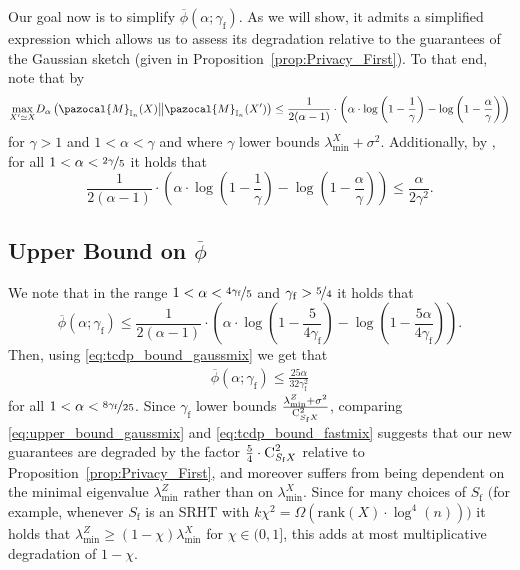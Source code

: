 \documentclass[11pt]{article}
\theoremstyle{definition}
\theoremstyle{plain}
\providecommand{\propositionref}[1]{Proposition~\ref{#1}}
\providecommand{\brI}{\mathbb{I}}
\providecommand{\KLDA}[2]{{D_{\alpha} \left( #1 \middle\| #2 \right)}}
\newcommand{\pM}{\pazocal{M}}
\begin{document}
Our goal now is to simplify $\overline{\phi}(\alpha; \gamma_{\mathrm{f}})$. As we will show, it admits a simplified expression which allows us to assess its degradation relative to the guarantees of the Gaussian sketch (given in \propositionref{prop:Privacy_First}). To that end, note that by \citet[Lemma.~1]{lev2025gaussianmix} 
\begin{align}
    \label{eq:upper_bound_gaussmix}
    \underset{X'\simeq X}{\max} \KLDA{\pM_{\brI_n}(X)}{\pM_{\brI_n}(X')} \leq \frac{1}{2(\alpha - 1)}\cdot \left(\alpha \cdot \log\left(1 - \frac{1}{\gamma}\right) - \log\left(1 - \frac{\alpha}{\gamma}\right)\right)
\end{align}
for $\gamma > 1$ and $1 < \alpha < \gamma$ and where $\gamma$ lower bounds $\lambda^{X}_{\min} + \sigma^2$. Additionally, by \citet[Corollary.~1]{lev2025gaussianmix}, for all $1 < \alpha < \nicefrac{2\gamma}{5}$ it holds that 
\begin{equation}
    \label{eq:tcdp_bound_gaussmix}
    \frac{1}{2(\alpha - 1)}\cdot \left(\alpha \cdot \log\left(1 - \frac{1}{\gamma}\right) - \log\left(1 - \frac{\alpha}{\gamma}\right)\right) \leq \frac{\alpha}{2\gamma^2}.
\end{equation}

\subsection{Upper Bound on $\overline{\phi}$}
We note that in the range $1 < \alpha < \nicefrac{4\gamma_{\mathrm{f}}}{5}$ and $\gamma_{\mathrm{f}} > \nicefrac{5}{4}$ it holds that   
\begin{equation}
    \label{eq:tcdp_bound_fastmix}
    \overline{\phi}(\alpha; \gamma_{\mathrm{f}}) \leq \frac{1}{2(\alpha - 1)}\cdot \left(\alpha \cdot \log\left(1 - \frac{5}{4\gamma_{\mathrm{f}}}\right) - \log\left(1 - \frac{5\alpha}{4\gamma_{\mathrm{f}}}\right)\right).
\end{equation}
Then, using \eqref{eq:tcdp_bound_gaussmix} we get that 
\begin{align}
    \overline{\phi}(\alpha; \gamma_{\mathrm{f}}) \leq \frac{25\alpha}{32\gamma^2_{\mathrm{f}}}
\end{align}
for all $1 < \alpha < \nicefrac{8\gamma_{\mathrm{f}}}{25}$.
Since $\gamma_{\mathrm{f}}$ lower bounds $\frac{\lambda^{Z}_{\min} + \sigma^2}{\textsc{C}^2_{S_{\mathrm{f}}X}}$, comparing \eqref{eq:upper_bound_gaussmix} and \eqref{eq:tcdp_bound_fastmix} suggests that our new guarantees are degraded by the factor $\frac{5}{4}\cdot \textsc{C}^2_{S_{\mathrm{f}}X}$ relative to \propositionref{prop:Privacy_First}, and moreover suffers from being dependent on the minimal eigenvalue $\lambda^{Z}_{\min}$ rather than on $\lambda^{X}_{\min}$. Since for many choices of $S_{\mathrm{f}}$ $\big($for example, whenever $S_{\mathrm{f}}$ is an SRHT with $k\chi^2 = \Omega\left(\mathrm{rank}(X)\cdot \log^4(n)\right)$$\big)$ it holds that $\lambda^{Z}_{\min} \geq (1-\chi)\lambda^{X}_{\min}$ for $\chi\in (0, 1]$, this adds at most multiplicative degradation of $1-\chi$.  
\end{document}
